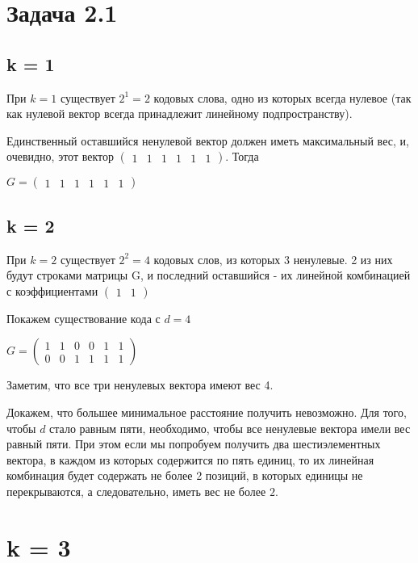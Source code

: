 \documentclass{article}
\begin{document}
	\section{Задача 2.1}
	
	\subsection{k = 1}
	
	При $k = 1$ существует $2^1 = 2$ кодовых слова, одно из которых всегда нулевое (так как нулевой вектор всегда принадлежит линейному подпространству).
	
	Единственный оставшийся ненулевой вектор должен иметь максимальный вес, и, очевидно, этот вектор $\left(
	\begin{array}{cccccc}
	1&1&1&1&1&1
	\end{array}
	\right)$. Тогда
	
	$
	G = \left(
	\begin{array}{cccccc}
	1&1&1&1&1&1
	\end{array}
	\right)
	$
	
	\subsection{k = 2}
	
	При $k = 2$ существует $2 ^ 2 = 4$ кодовых слов, из которых 3 ненулевые. 2 из них будут строками матрицы G, и последний оставшийся - их линейной комбинацией с коэффициентами $\left(
	\begin{array}{cccccc}
	1&1
	\end{array}
	\right)$
	
	Покажем существование кода с $d = 4$
	
	$
	G = \left(
	\begin{array}{cccccc}
	1&1&0&0&1&1\\
	0&0&1&1&1&1
	\end{array}
	\right)
	$
	
	Заметим, что все три ненулевых вектора имеют вес 4.
	
 	Докажем, что большее минимальное расстояние получить невозможно. Для того, чтобы $d$ стало равным пяти, необходимо, чтобы все ненулевые вектора имели вес равный пяти. При этом если мы попробуем получить два шестиэлементных вектора, в каждом из которых содержится по пять единиц, то их линейная комбинация будет содержать не более 2 позиций, в которых единицы не перекрываются, а следовательно, иметь вес не более $2$.
	
	\section{k = 3}
	
\end{document}
